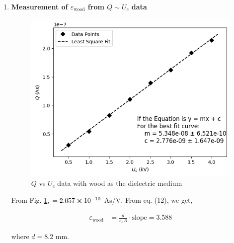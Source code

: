 \begin{enumerate}
        \item \textbf{Measurement of $\varepsilon_\text{wood}$ from $Q \sim U_c$ data}
            \begin{figure}[H]
                \centering
                \includegraphics[width=0.8\columnwidth]{images/g4.png}
                \caption{$Q$ vs $U_c$ data with wood as the dielectric medium}
                \label{g4}
            \end{figure}

            From Fig. \ref{g4}, $=2.057 \cross 10^{-10}$ As/V. From eq. (12), we get,
                
            \begin{align*}
                \varepsilon_\text{wood} &= \frac{d}{\varepsilon_oA} \cdot \text{slope}=3.588
            \end{align*}
            
            where $d=8.2$ mm.

    \end{enumerate}


